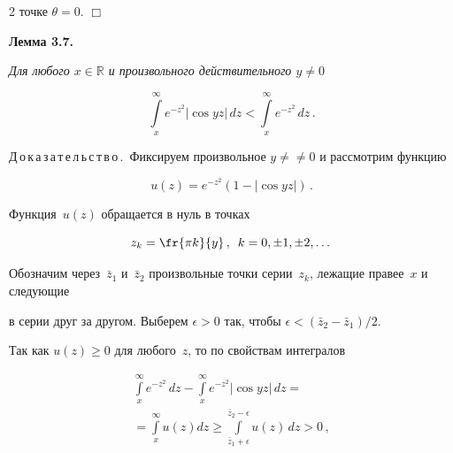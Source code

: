 \begin{multicols}{2}
точке $\theta=0$. \hfill $\Box$





\medskip





\noindent


\textbf{Лемма 3.7.}


\textit{Для любого $x\in{\mathbb{R}}$ и произвольного действительного $y\ne0$}


$$


\int\limits_x^{\infty} e^{-z^2}|\cos yz|\,dz < \int\limits_x^{\infty} e^{-z^2}\,dz\,.


$$








\medskip





\noindent


Д\,о\,к\,а\,з\,а\,т\,е\,л\,ь\,с\,т\,в\,о\,.\  Фиксируем произвольное $y\ne$\linebreak $\ne 0$ и рассмотрим функцию


$$


u(z) = e^{-z^2}\left(1-\left\vert \cos yz\right\vert \right)\,.


$$


Функция~$u(z)$ обращается в нуль в точках


$$


z_k=\fr{\pi k}{y}\,, \enskip k=0,\pm1,\pm2,\dots


$$


Обозначим через~$\bar{z}_1$ и~$\bar{z}_2$ произвольные точки серии~$z_k$, лежащие правее~$x$ и следующие 


в серии друг за другом. Выберем $\epsilon > 0$ так, чтобы $\epsilon < (\bar{z}_2-\bar{z}_1)/2$. 


Так как $u(z)\geq0$ для любого~$z$, то по свойствам интегралов


\begin{multline*}


\int\limits_x^{\infty} e^{-z^2}\,dz - \int\limits_x^{\infty} e^{-z^2}|\cos yz|\,dz ={}\\


{}= \int\limits_x^{\infty}u(z)dz \geq \int\limits_{\bar{z}_1+\epsilon}^{\bar{z}_2-\epsilon}u(z)\,dz > 0\,,


\end{multline*}



\end{multicols}
